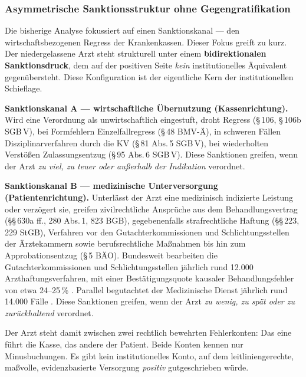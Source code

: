 \documentclass{umbruch-position}
\begin{document}
\subsubsection{Asymmetrische Sanktionsstruktur ohne Gegengratifikation}
\label{subsubsec:asymmetrie-gegengratifikation}

Die bisherige Analyse fokussiert auf einen Sanktionskanal --- den wirtschaftsbezogenen Regress der Krankenkassen. Dieser Fokus greift zu kurz. Der niedergelassene Arzt steht strukturell unter einem \textbf{bidirektionalen Sanktionsdruck}, dem auf der positiven Seite \textit{kein} institutionelles Äquivalent gegenübersteht. Diese Konfiguration ist der eigentliche Kern der institutionellen Schieflage.

\textbf{Sanktionskanal A --- wirtschaftliche Übernutzung (Kassenrichtung).} Wird eine Verordnung als unwirtschaftlich eingestuft, droht Regress (\S\,106, \S\,106b SGB\,V), bei Formfehlern Einzelfallregress (\S\,48 BMV-\"A), in schweren Fällen Disziplinarverfahren durch die KV (\S\,81 Abs.\,5 SGB\,V), bei wiederholten Verstößen Zulassungsentzug (\S\,95 Abs.\,6 SGB\,V). Diese Sanktionen greifen, wenn der Arzt \emph{zu viel, zu teuer oder außerhalb der Indikation} verordnet.

\textbf{Sanktionskanal B --- medizinische Unterversorgung (Patientenrichtung).} Unterlässt der Arzt eine medizinisch indizierte Leistung oder verzögert sie, greifen zivilrechtliche Ansprüche aus dem Behandlungsvertrag (\S\S\,630a ff., 280 Abs.\,1, 823 BGB), gegebenenfalls strafrechtliche Haftung (\S\S\,223, 229 StGB), Verfahren vor den Gutachterkommissionen und Schlichtungsstellen der Ärztekammern sowie berufsrechtliche Maßnahmen bis hin zum Approbationsentzug (\S\,5 BÄO). Bundesweit bearbeiten die Gutachterkommissionen und Schlichtungsstellen jährlich rund 12.000 Arzthaftungsverfahren, mit einer Bestätigungsquote kausaler Behandlungsfehler von etwa 24--25\,\% \cite{schlichtung2023}. Parallel begutachtet der Medizinische Dienst jährlich rund 14.000 Fälle \cite{mdbund2023}. Diese Sanktionen greifen, wenn der Arzt \emph{zu wenig, zu spät oder zu zurückhaltend} verordnet.

Der Arzt steht damit zwischen zwei rechtlich bewehrten Fehlerkonten: Das eine führt die Kasse, das andere der Patient. Beide Konten kennen nur Minus\-buchungen. Es gibt kein institutionelles Konto, auf dem leitliniengerechte, maßvolle, evidenzbasierte Versorgung \textit{positiv} gutgeschrieben würde.
\end{document}
